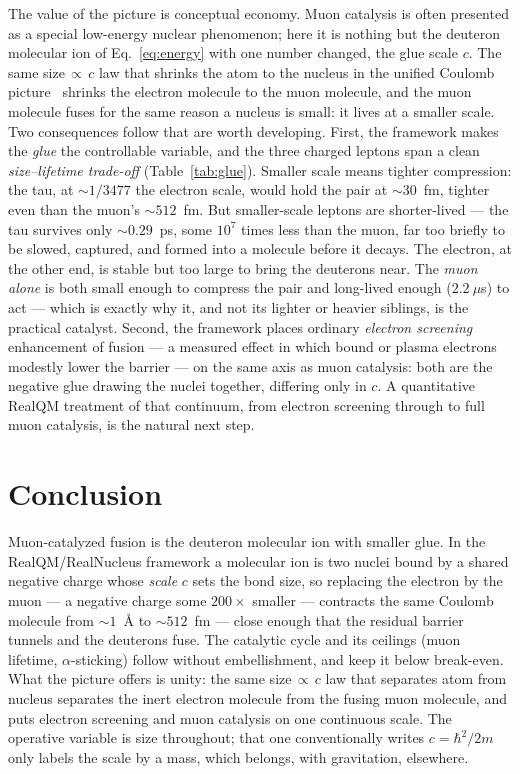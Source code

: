 \documentclass[11pt]{article}
\begin{document}
The value of the picture is conceptual economy. Muon catalysis is often presented as a special
low-energy nuclear phenomenon; here it is nothing but the deuteron molecular ion of
Eq.~\eqref{eq:energy} with one number changed, the glue scale $c$. The same size$\,\propto\,c$
law that shrinks the atom to the nucleus in the unified Coulomb picture~\cite{Johnson-Unified} shrinks
the electron molecule to the muon molecule, and the muon molecule fuses for the same reason a nucleus
is small: it lives at a smaller scale. Two consequences follow that are worth
developing. First, the framework makes the \emph{glue} the controllable variable, and the three charged
leptons span a clean \emph{size--lifetime trade-off} (Table~\ref{tab:glue}). Smaller scale means tighter
compression: the tau, at $\sim\!1/3477$ the electron scale, would hold the pair at $\sim\!30$~fm,
tighter even than the muon's $\sim\!512$~fm. But smaller-scale leptons are shorter-lived --- the tau
survives only $\sim\!0.29$~ps, some $10^{7}$ times less than the muon, far too briefly to be slowed,
captured, and formed into a molecule before it decays. The electron, at the other end, is stable but
too large to bring the deuterons near. The \emph{muon alone} is both small enough to compress the pair
and long-lived enough ($2.2~\mu$s) to act --- which is exactly why it, and not its lighter or heavier
siblings, is the practical catalyst. Second, the framework places ordinary \emph{electron screening}
enhancement of fusion --- a measured effect in which bound or plasma electrons modestly lower the
barrier --- on the same axis as muon catalysis: both are the negative glue drawing the nuclei together,
differing only in $c$. A quantitative RealQM treatment of that continuum, from electron screening
through to full muon catalysis, is the natural next step.

\section{Conclusion}

Muon-catalyzed fusion is the deuteron molecular ion with smaller glue. In the RealQM/RealNucleus
framework a molecular ion is two nuclei bound by a shared negative charge whose \emph{scale} $c$ sets the
bond size, so replacing the electron by the muon --- a negative charge some $200\times$ smaller ---
contracts the same Coulomb molecule from $\sim\!1$~{\AA} to $\sim\!512$~fm --- close enough that the
residual barrier tunnels and the deuterons fuse. The catalytic cycle and its ceilings (muon lifetime,
$\alpha$-sticking) follow without embellishment, and keep it below break-even. What the picture offers
is unity: the same size$\,\propto\,c$ law that separates atom from nucleus separates the inert
electron molecule from the fusing muon molecule, and puts electron screening and muon catalysis on one
continuous scale. The operative variable is size throughout; that one conventionally writes
$c=\hbar^2/2m$ only labels the scale by a mass, which belongs, with gravitation, elsewhere.
\end{document}
